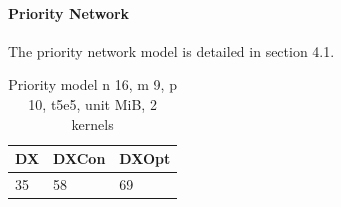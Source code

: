 \paragraph*{Priority Network}
The priority network model is detailed in section 4.1.\\
\begin{table}[lhtb]
	\centering
	\caption{Priority model n 16, m 9, p 10,  t5e5, unit MiB, 2 kernels}
	\label{pmod_mem}
	\begin{tabular}{| l | l | l |}
		\hline
		DX &DXCon &DXOpt\\ \hline
		35 & 58 &69\\ \hline
	\end{tabular}
\end{table}
